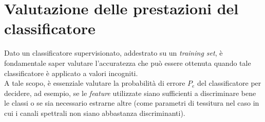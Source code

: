 \chapter{Valutazione delle prestazioni del classificatore}

\label{cap:prestazioni} %




Dato un classificatore supervisionato, addestrato su un \emph{training set}, è fondamentale saper valutare l'accuratezza che può essere ottenuta quando tale classificatore è applicato a valori incogniti.\\
A tale scopo, è essenziale valutare la probabilità di errore $P_e$ del classificatore per decidere, ad esempio, se le \emph{feature} utilizzate siano sufficienti a discriminare bene le classi o se sia necessario estrarne altre (come parametri di tessitura nel caso in cui i canali spettrali non siano abbastanza discriminanti).
\clearpage

